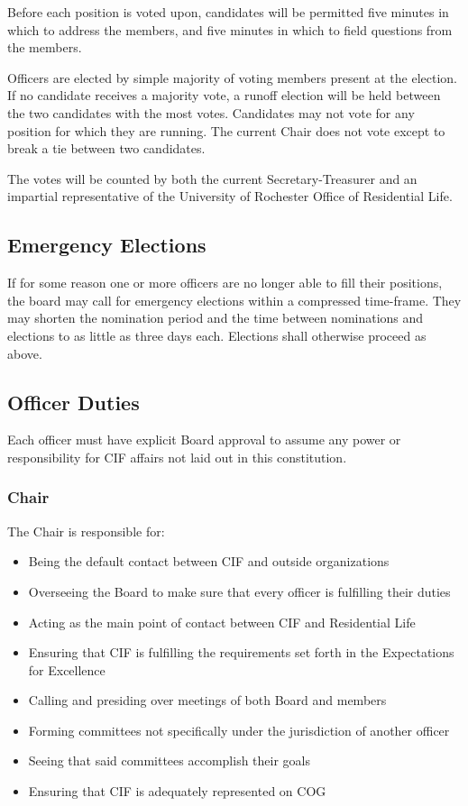 	Before each position is voted upon, candidates will be permitted five minutes in which to address the members, and five minutes in which to field questions from the members.

	Officers are elected by simple majority of voting members present at the election. If no candidate receives a majority vote, a runoff election will be held between the two candidates with the most votes. Candidates may not vote for any position for which they are running. The current Chair does not vote except to break a tie between two candidates.

	The votes will be counted by both the current Secretary-Treasurer and an impartial representative of the University of Rochester Office of Residential Life.



	\subsection {Emergency Elections}

	If for some reason one or more officers are no longer able to fill their positions, the board may call for emergency elections within a compressed time-frame. They may shorten the nomination period and the time between nominations and elections to as little as three days each. Elections shall otherwise proceed as above.



	\subsection {Officer Duties}

	Each officer must have explicit Board approval to assume any power or responsibility for CIF affairs not laid out in this constitution.



		\subsubsection {Chair}

The Chair is responsible for:
\begin{itemize}
	\item Being the default contact between CIF and outside organizations
	\item Overseeing the Board to make sure that every officer is fulfilling their duties
	\item Acting as the main point of contact between CIF and Residential Life
	\item Ensuring that CIF is fulfilling the requirements set forth in the Expectations for Excellence
	\item Calling and presiding over meetings of both Board and members
	\item Forming committees not specifically under the jurisdiction of another officer
	\item Seeing that said committees accomplish their goals
	\item Ensuring that CIF is adequately represented on COG 
\end{itemize}



